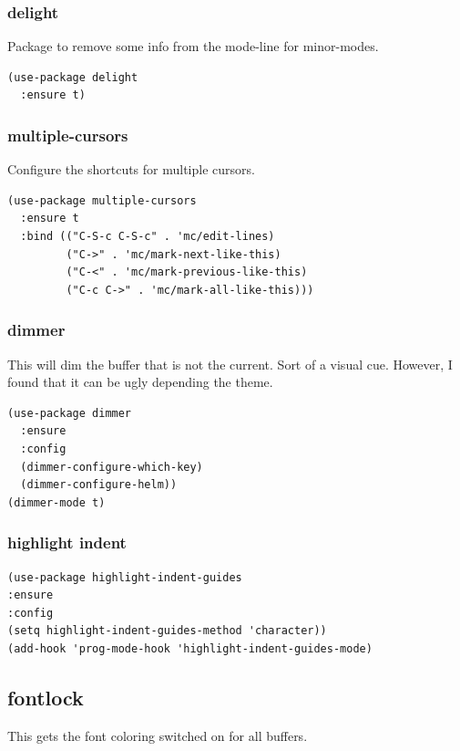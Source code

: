 \documentclass[11pt]{article}
\begin{document}
\subsubsection{delight}
\label{sec:orgf5bc969}
Package to remove some info from the mode-line for minor-modes.
\begin{verbatim}
(use-package delight
  :ensure t)
\end{verbatim}
\subsubsection{multiple-cursors}
\label{sec:org927c3c6}

Configure the shortcuts for multiple cursors.

\begin{verbatim}
(use-package multiple-cursors
  :ensure t
  :bind (("C-S-c C-S-c" . 'mc/edit-lines)
         ("C->" . 'mc/mark-next-like-this)
         ("C-<" . 'mc/mark-previous-like-this)
         ("C-c C->" . 'mc/mark-all-like-this)))
\end{verbatim}
\subsubsection{dimmer}
\label{sec:org6bf3dd9}

This will dim the buffer that is not the current. Sort of a visual
cue. However, I found that it can be ugly depending the theme.

\begin{verbatim}
(use-package dimmer
  :ensure
  :config
  (dimmer-configure-which-key)
  (dimmer-configure-helm))
(dimmer-mode t)
\end{verbatim}

\subsubsection{highlight indent}
\label{sec:org7520ccd}
\begin{verbatim}
(use-package highlight-indent-guides
:ensure
:config
(setq highlight-indent-guides-method 'character))
(add-hook 'prog-mode-hook 'highlight-indent-guides-mode)
\end{verbatim}
\subsection{fontlock}
\label{sec:org1933d98}

This gets the font coloring switched on for all buffers.
\end{document}
